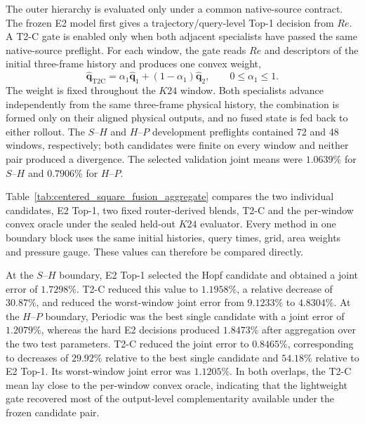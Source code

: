 The outer hierarchy is evaluated only under a common native-source contract.
The frozen E2 model first gives a trajectory/query-level Top-1 decision from
$Re$.  A T2-C gate is enabled only when both adjacent specialists have passed
the same native-source preflight.  For each window, the gate reads $Re$ and
descriptors of the initial three-frame history and produces one convex weight,
\begin{equation}
  \widehat{\boldsymbol{q}}_{\mathrm{T2C}}
  =
  \alpha_1\widehat{\boldsymbol{q}}_1
  +(1-\alpha_1)\widehat{\boldsymbol{q}}_2,
  \qquad 0\le\alpha_1\le1 .
  \label{eq:centered_square_t2c}
\end{equation}
The weight is fixed throughout the $K24$ window.  Both specialists advance
independently from the same three-frame physical history, the combination is
formed only on their aligned physical outputs, and no fused state is fed back
to either rollout.  The $S$--$H$ and $H$--$P$ development preflights contained
72 and 48 windows, respectively; both candidates were finite on every window
and neither pair produced a divergence.  The selected validation joint means
were $1.0639\%$ for $S$--$H$ and $0.7906\%$ for $H$--$P$.

Table~\ref{tab:centered_square_fusion_aggregate} compares the two individual
candidates, E2 Top-1, two fixed router-derived blends, T2-C and the
per-window convex oracle under the sealed held-out $K24$ evaluator.  Every
method in one boundary block uses the same initial histories, query times,
grid, area weights and pressure gauge.  These values can therefore be
compared directly.

At the $S$--$H$ boundary, E2 Top-1 selected the Hopf candidate and obtained a
joint error of $1.7298\%$.  T2-C reduced this value to $1.1958\%$, a relative
decrease of $30.87\%$, and reduced the worst-window joint error from
$9.1233\%$ to $4.8304\%$.  At the $H$--$P$ boundary, Periodic was the best
single candidate with a joint error of $1.2079\%$, whereas the hard E2
decisions produced $1.8473\%$ after aggregation over the two test parameters.
T2-C reduced the joint error to $0.8465\%$, corresponding to decreases of
$29.92\%$ relative to the best single candidate and $54.18\%$ relative to E2
Top-1.  Its worst-window joint error was $1.1205\%$.  In both overlaps, the
T2-C mean lay close to the per-window convex oracle, indicating that the
lightweight gate recovered most of the output-level complementarity available
under the frozen candidate pair.

